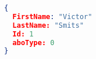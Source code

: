 \begin{lstlisting}[language=json,firstnumber=1]
{
  FirstName: "Victor"
  LastName: "Smits"
  Id: 1
  aboType: 0
}
\end{lstlisting}